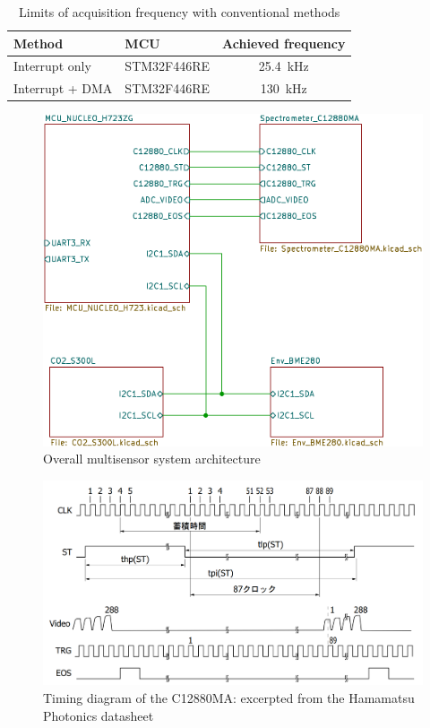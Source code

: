 \documentclass[main]{subfiles}
\begin{document}
\begin{table}[t]
    \centering
    \caption{Limits of acquisition frequency with conventional methods}
    \label{tab:previous_method_limit}
    \begin{tabular}{l|l|c}
        \hline
        \textbf{Method} & \textbf{MCU} & \textbf{Achieved frequency} \\
        \hline \hline
        Interrupt only      & STM32F446RE & \SI{25.4}{\kilo\hertz}\\
        Interrupt + DMA     & STM32F446RE & \SI{130}{\kilo\hertz} \\
        \hline
    \end{tabular}
\end{table}

\begin{figure}[t]
  \centering
  \includegraphics[width=\linewidth]{figures/2/AGV_Multisensor.pdf}
  \caption{Overall multisensor system architecture}
  \label{fig:agv_multisensor_overall}
\end{figure}


\begin{figure}[t]
  \centering
  \includegraphics[width=0.9\linewidth]{figures/2/placeholder_C12880MA_timing.png}
  \caption{Timing diagram of the C12880MA: excerpted from the Hamamatsu Photonics datasheet\cite{ref:C12880MA}}
  \label{fig:c12880ma_timing}
\end{figure}
\end{document}
